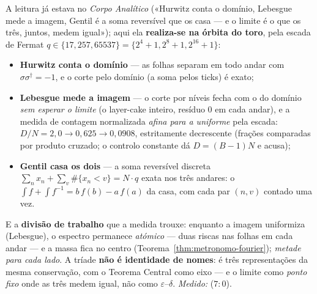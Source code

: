 \documentclass[livro.tex]{subfiles}
\begin{document}
\begin{observacao}\label{obs:triade-central}
A leitura já estava no \emph{Corpo Analítico} («Hurwitz conta o domínio,
Lebesgue mede a imagem, Gentil é a soma reversível que os casa --- e o
limite é o que os três, juntos, medem igual»); aqui ela
\textbf{realiza-se na órbita do toro}, pela escada de Fermat
$q\in\{17,257,65537\}=\{2^{4}{+}1,2^{8}{+}1,2^{16}{+}1\}$:
\begin{itemize}
\item \textbf{Hurwitz conta o domínio} --- as folhas separam em todo
andar com $\sigma\sigma^{\dagger}=-1$, e o corte pelo domínio (a soma
pelos ticks) é exato;
\item \textbf{Lebesgue mede a imagem} --- o corte por níveis fecha com
o do domínio \emph{sem esperar o limite} (o layer-cake inteiro,
resíduo $0$ em cada andar), e a medida de contagem normalizada
\emph{afina para a uniforme} pela escada: $D/N = 2{,}0 \to 0{,}625 \to
0{,}0908$, estritamente decrescente (frações comparadas por produto
cruzado; o controlo constante dá $D=(B{-}1)N$ e acusa);
\item \textbf{Gentil casa os dois} --- a soma reversível discreta
$\sum_{n}x_{n}+\sum_{v}\#\{x_{n}<v\}=N\!\cdot\!q$ exata nos três
andares: o $\int f+\int f^{-1}=b\,f(b)-a\,f(a)$ da casa, com cada par
$(n,v)$ contado uma vez.
\end{itemize}
E a \textbf{divisão de trabalho} que a medida trouxe: enquanto a
imagem uniformiza (Lebesgue), o espectro permanece \emph{atómico} ---
duas riscas nas folhas em cada andar --- e a massa fica no centro
(Teorema~\ref{thm:metronomo-fourier}); \emph{metade para cada lado}.
A tríade \textbf{não é identidade de nomes}: é três representações da
mesma conservação, com o Teorema Central como eixo --- e o limite como
\emph{ponto fixo} onde as três medem igual, não como
$\varepsilon$--$\delta$.
\emph{Medido:}  ($7{:}0$).
\end{observacao}
\end{document}
